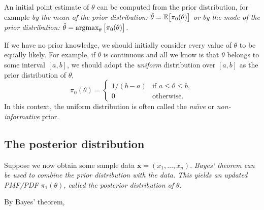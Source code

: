 An initial point estimate of $\theta$ can be computed from the prior distribution, for example
\bit
\it by the \emph{mean} of the prior distribution: $\hat{\theta} = \mathbb{E}\big[\pi_0(\theta)\big]$ or
\it by the \emph{mode} of the prior distribution: $\hat{\theta} = \operatorname*{\arg\!\max}_{\theta}\big[\pi_0(\theta)\big]$.
\eit

If we have no prior knowledge, we should initially consider every value of $\theta$ to be equally likely. For example, if $\theta$ is continuous and all we know is that $\theta$ belongs to some interval $[a,b]$, we should adopt the \emph{uniform} distribution over $[a,b]$ as the prior distribution of $\theta$,
\[
\pi_0(\theta) = \left\{\begin{array}{ll}
	1/(b-a)	& \text{if } a\leq\theta\leq b, \\
	0	& \text{otherwise.}
\end{array}\right.
\]
In this context, the uniform distribution is often called the \emph{na\"{\i}ve} or \emph{non-informative} prior.

\subsection*{The posterior distribution}
Suppose we now obtain some sample data $\mathbf{x}=(x_1,\ldots,x_n)$. 
\bit
\it Bayes' theorem can be used to combine the prior distribution with the data.
\it This yields an updated PMF/PDF $\pi_1(\theta)$, called the \emph{posterior distribution} of $\theta$.
\eit

By Bayes' theorem, 
%

